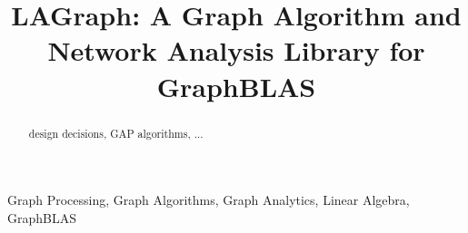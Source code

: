 \documentclass[conference]{IEEEtran}
\begin{document}
\title{LAGraph: A Graph Algorithm and Network Analysis Library for GraphBLAS}

\author{
}

\maketitle

\begin{abstract}
design decisions, GAP algorithms, ...
\end{abstract}

\begin{IEEEkeywords}
Graph Processing, Graph Algorithms, Graph Analytics, Linear Algebra, GraphBLAS
\end{IEEEkeywords}















\clearpage


\end{document}
